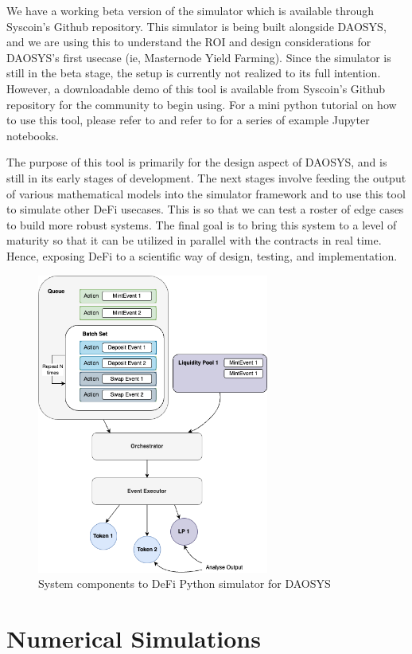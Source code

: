 \documentclass[journal,twocolumn,12pt]{ieeesyscoin}
\begin{document}
We have a working beta version of the simulator which is available through Syscoin’s Github repository. This simulator is being built alongside DAOSYS, and we are using this to understand the ROI and design considerations for DAOSYS’s first usecase (ie, Masternode Yield Farming). Since the simulator is still in the beta stage, the setup is currently not realized to its full intention. However, a downloadable demo of this tool is available from Syscoin's Github repository for the community to begin using. For a mini python tutorial on how to use this tool, please refer to \cite{Moo22B} and refer to \cite{DAOSim22} for a series of example Jupyter notebooks.

The purpose of this tool is primarily for the design aspect of DAOSYS, and is still in its early stages of development. The next stages involve feeding the output of various mathematical models into the simulator framework and to use this tool to simulate other DeFi usecases. This is so that we can test a roster of edge cases to build more robust systems. The final goal is to bring this system to a level of maturity so that it can be utilized in parallel with the contracts in real time. Hence, exposing DeFi to a scientific way of design, testing, and implementation.

\begin{figure}[h!]
\includegraphics[width=3in]{img/simulator.png}
\caption{System components to DeFi Python simulator for DAOSYS} 
\label{fig:simulator}
\end{figure} 

\section{Numerical Simulations}
\label{sec:numerical_simulations}
\end{document}
